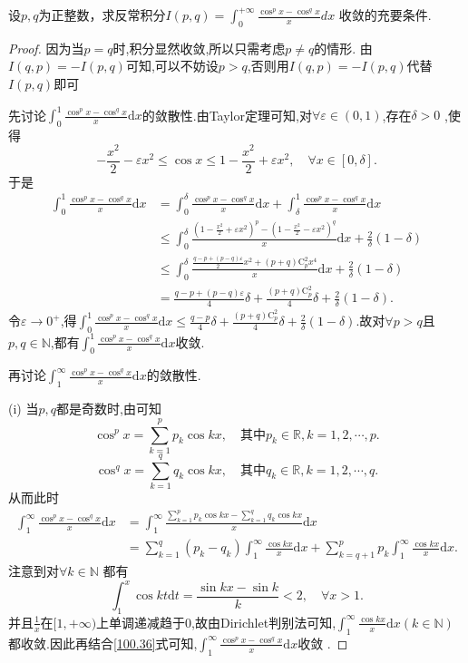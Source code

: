 \documentclass[../../main.tex]{subfiles}
\begin{document}
\begin{example}
设\(p,q\)为正整数，求反常积分$I(p,q)=\int_{0}^{+\infty}\frac{\cos^{p}x - \cos^{q}x}{x}dx$
收敛的充要条件.
\end{example}
\begin{proof}
因为当$p=q$时,积分显然收敛,所以只需考虑$p\ne q$的情形. 由$I(q,p) =-I(p,q)$可知,可以不妨设$p>q$,否则用$I(q,p) =-I(p,q)$代替$I(p,q)$即可

先讨论$\int_0^1{\frac{\cos ^px-\cos ^qx}{x}\mathrm{d}x}$的敛散性.由Taylor定理可知,对$\forall \varepsilon \in (0,1)$,存在$\delta >0$ ,使得  
\[
-\frac{x^2}{2}-\varepsilon x^2\leqslant \cos x\leqslant 1-\frac{x^2}{2}+\varepsilon x^2 ,\quad \forall x\in [0,\delta].
\]  
于是  
\begin{align*}
\int_0^1{\frac{\cos ^px-\cos ^qx}{x}\mathrm{d}x}&=\int_0^{\delta}{\frac{\cos ^px-\cos ^qx}{x}\mathrm{d}x}+\int_{\delta}^1{\frac{\cos ^px-\cos ^qx}{x}\mathrm{d}x}\\
&\leqslant \int_0^{\delta}{\frac{(1-\frac{x^2}{2}+\varepsilon x^2)^p-(1-\frac{x^2}{2}-\varepsilon x^2)^q}{x}\mathrm{d}x}+\frac{2}{\delta}(1-\delta)\\
&\leqslant \int_0^{\delta}{\frac{\frac{q-p+(p-q)\varepsilon}{2}x^2+(p+q)\mathrm{C}_{p}^{2}x^4}{x}\mathrm{d}x}+\frac{2}{\delta}(1-\delta)\\
&=\frac{q-p+(p-q)\varepsilon}{4}\delta +\frac{(p+q)\mathrm{C}_{p}^{2}}{4}\delta +\frac{2}{\delta}(1-\delta).
\end{align*}  
令$\varepsilon \rightarrow 0^+$,得$\int_0^1{\frac{\cos ^px-\cos ^qx}{x}\mathrm{d}x}\leqslant \frac{q-p}{4}\delta +\frac{(p+q)\mathrm{C}_{p}^{2}}{4}\delta +\frac{2}{\delta}(1-\delta)$.故对$\forall p>q$且$p,q\in \mathbb{N}$,都有$\int_0^1{\frac{\cos ^px-\cos ^qx}{x}\mathrm{d}x}$收敛.

再讨论$\int_1^{\infty}{\frac{\cos ^px-\cos ^qx}{x}\mathrm{d}x}$的敛散性.

(i) 当$p,q$都是奇数时,由可知  
$$
\cos ^px=\sum_{k=1}^p{p_k\cos kx} ,\quad \text{其中}p_k\in \mathbb{R} , k=1,2,\cdots,p.
$$  
$$
\cos ^qx=\sum_{k=1}^q{q_k\cos kx} ,\quad \text{其中}q_k\in \mathbb{R} , k=1,2,\cdots,q.
$$  
从而此时  
\begin{align*}
\int_1^{\infty}{\frac{\cos ^px-\cos ^qx}{x}\mathrm{d}x}&=\int_1^{\infty}{\frac{\sum\limits_{k=1}^p{p_k\cos kx}-\sum\limits_{k=1}^q{q_k\cos kx}}{x}\mathrm{d}x}\\
&=\sum\limits_{k=1}^q{(p_k-q_k)\int_1^{\infty}{\frac{\cos kx}{x}\mathrm{d}x}}+\sum\limits_{k=q+1}^p{p_k\int_1^{\infty}{\frac{\cos kx}{x}\mathrm{d}x}} .\label{100.36}
\end{align*}  
注意到对$\forall k\in \mathbb{N}$ 都有  
$$
\int_1^x{\cos kt\mathrm{d}t}=\frac{\sin kx-\sin k}{k}<2 ,\quad \forall x>1.
$$  
并且$\frac{1}{x}$在$[1,+\infty)$上单调递减趋于0,故由Dirichlet判别法可知,$\int_1^{\infty}{\frac{\cos kx}{x}\mathrm{d}x}(k\in \mathbb{N})$都收敛.因此再结合\eqref{100.36}式可知,$\int_1^{\infty}{\frac{\cos ^px-\cos ^qx}{x}\mathrm{d}x}$收敛 . 


\end{proof}
\end{document}
